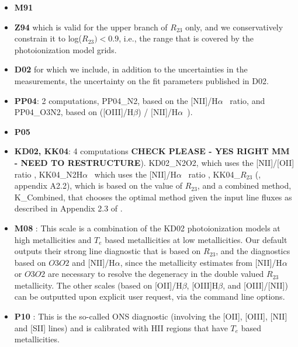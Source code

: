 \documentclass{emulateapj}
\newcommand{\ha}{H$\alpha$}
\newcommand{\hb}{H$\beta$}
\begin{document}
\begin{itemize}
\item {\bf M91} \citep{mcgaugh91}
\item {\bf Z94} \citep{zaritsky94} which is valid for the upper branch of $R_{23}$ only, and we conservatively constrain it to log($R_{23})<0.9$, i.e., the range that is covered by the photoionization model grids.
\item {\bf D02} \citep{denicolo02} for which we include, in addition to the uncertainties in the measurements, the uncertainty on the fit parameters published in D02.
\item {\bf PP04}:  \citep{pettini04} 2 computations,  PP04\_N2, based on the [NII]/\ha~ ratio, and PP04\_O3N2, based on  ([OIII]/\hb) / [NII]/\ha~).  
\item {\bf P05} \citep{pilyugin05}
\item {\bf KD02, KK04}: 4 computations \textbf{CHECK PLEASE - YES RIGHT MM - NEED TO RESTRUCTURE}). KD02\_N2O2, which uses the [NII]/[OII] ratio \citep{kewley02}, KK04\_N2\ha~  which uses the [NII]/\ha~ ratio \citep{kobulnicky04}, KK04\_$R_{23}$ (\citealt{kewley08}, appendix A2.2), which is based on the value of $R_{23}$, and a combined method, K\_Combined, that chooses the optimal method given the input line fluxes as described in Appendix 2.3 of \citet{kewley08}. 
\item {\bf M08} \citep{maiolino08}: This scale is a combination of the KD02 photoionization models at high metallicities and $T_e$ based metallicities at low metallicities. Our default outputs their strong line diagnostic that is based on $R_{23}$, and the diagnostics based on $O3O2$ and [NII]/\ha, since the metallicity estimates from  [NII]/\ha~ or $O3O2$ are necessary to resolve the degeneracy in the double valued $R_{23}$ metallicity. The other scales (based on [OII]/\hb, [OIII]\hb, and [OIII]/[NII]) can be outputted upon explicit user request, via the command line options. 
\item {\bf P10} \citep{pilyugin10}: This is the so-called ONS diagnostic (involving the [OII], [OIII], [NII] and [SII] lines) and is calibrated with HII regions that have $T_e$ based metallicities.

\end{itemize}
\end{document}

